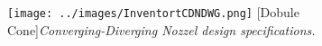 \begin{figure}[H]
\centering
\texttt{[image: ../images/InventortCDNDWG.png]}
[Dobule Cone]{\textit{Converging-Diverging Nozzel design specifications.}}
\label{fig:InventortCDNDWG}
\end{figure}
